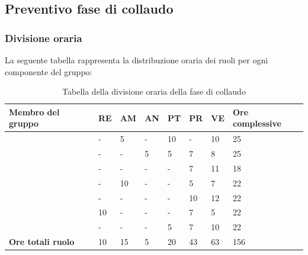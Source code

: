 \subsection{Preventivo fase di collaudo}

\subsubsection{Divisione oraria}
La seguente tabella rappresenta la distribuzione oraria dei ruoli per ogni componente del gruppo:
{

\renewcommand{\arraystretch}{2}
\begin{longtable}[h!] { C{3.5cm} C{1cm} C{1cm} C{1cm} C{1cm} C{1cm} C{1cm} C{2cm}}
\caption{Tabella della divisione oraria della fase di collaudo}	\\
\rowcolor{\primaryColor}

\textcolor{\secondaryColor}{\textbf{Membro del gruppo}} & 
\textcolor{\secondaryColor}{\textbf{RE}} & 
\textcolor{\secondaryColor}{\textbf{AM}} & 
\textcolor{\secondaryColor}{\textbf{AN}} & 
\textcolor{\secondaryColor}{\textbf{PT}} & 
\textcolor{\secondaryColor}{\textbf{PR}} & 
\textcolor{\secondaryColor}{\textbf{VE}} & 
\textcolor{\secondaryColor}{\textbf{Ore complessive}}\\	
\endhead

\AW{}                     &  - &  5 &  - & 10 & - & 10 & 25 \\
\AT{}                     &  - &  - &  5 & 5 & 7 & 8 & 25 \\
\AD{}                     &  - &  - &  - & - & 7 & 11 & 18 \\
\EC{}                     &  - &  10 &  - & - & 5 & 7 & 22 \\
\EM{}                     &  - &  - &  - & - & 10 & 12 & 22 \\
\FP{}                     & 10 & - &  - & - & 7 & 5 & 22 \\
\GG{}                     &  - &  - &  - & 5 & 7 & 10 & 22 \\
\textbf{Ore totali ruolo} & 10 & 15 & 5 & 20 & 43 & 63 & 156 \\

\end{longtable}
}



\clearpage


